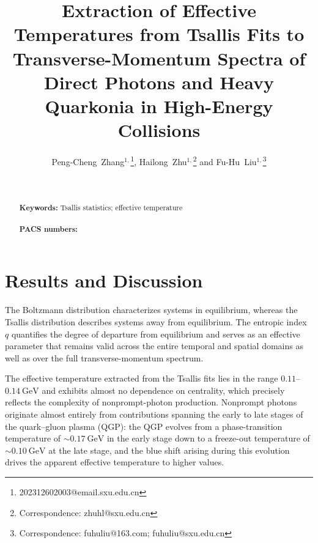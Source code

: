 \documentclass[onecolumn]{revtex4}
\begin{document}
\title{Extraction of Effective Temperatures from Tsallis Fits to
Transverse-Momentum Spectra of Direct Photons and Heavy Quarkonia in
High-Energy Collisions} \vspace{0.5cm}

\author{Peng-Cheng~Zhang$^{1,}$\footnote{202312602003@email.sxu.edu.cn},
Hailong~Zhu$^{1,}$\footnote{Correspondence: zhuhl@sxu.edu.cn} and
Fu-Hu~Liu$^{1,}$\footnote{Correspondence: fuhuliu@163.com;
fuhuliu@sxu.edu.cn}}


\begin{abstract}

\vspace{0.5cm}

\\
\\
{\bf Keywords:} Tsallis statistics; effective temperature
\\
\\
{\bf PACS numbers:}
\\
\end{abstract}

\maketitle

\parindent=15pt


\section{Results and Discussion}


The Boltzmann distribution characterizes systems in equilibrium, whereas
the Tsallis distribution describes systems away from equilibrium. The
entropic index~$q$ quantifies the degree of departure from equilibrium
and serves as an effective parameter that remains valid across the entire
temporal and spatial domains as well as over the full transverse-momentum
spectrum.

The effective temperature extracted from the Tsallis fits lies in the
range $0.11$--$0.14~\mathrm{GeV}$ and exhibits almost no dependence on
centrality, which precisely reflects the complexity of nonprompt-photon
production. Nonprompt photons originate almost entirely from contributions
spanning the early to late stages of the quark--gluon plasma (QGP): the
QGP evolves from a phase-transition temperature of $\sim 0.17~\mathrm{GeV}$
in the early stage down to a freeze-out temperature of $\sim 0.10~\mathrm{GeV}$
at the late stage, and the blue shift arising during this evolution drives
the apparent effective temperature to higher values. %
\end{document}
